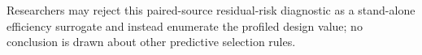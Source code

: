 Researchers may reject this paired-source residual-risk diagnostic as a stand-alone efficiency surrogate and instead enumerate the profiled design value; no conclusion is drawn about other predictive selection rules.